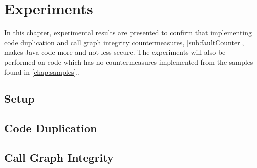 \chapter{Experiments}
In this chapter, experimental results are presented to confirm that implementing code duplication and call graph integrity countermeasures, \cref{sub:faultCounter}, makes Java code more and not less secure. The experiments will also be performed on code which has no countermeasures implemented from the \jc samples found in \cref{chap:samples}..
%
\section{Setup}

\section{Code Duplication}

\section{Call Graph Integrity}

